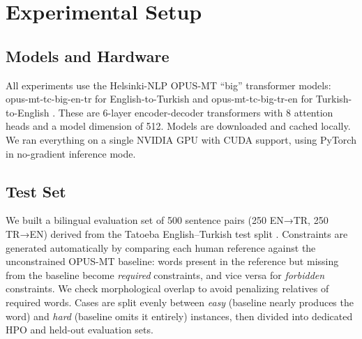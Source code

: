 \documentclass[conference]{IEEEtran}
\begin{document}
\begin{table}[!t]
\end{table}


\section{Experimental Setup}

\subsection{Models and Hardware}

All experiments use the Helsinki-NLP OPUS-MT ``big'' transformer models: opus-mt-tc-big-en-tr for English-to-Turkish and opus-mt-tc-big-tr-en for Turkish-to-English \cite{tiedemann2020opus, tiedemann2023democratizing}. These are 6-layer encoder-decoder transformers with 8 attention heads and a model dimension of 512. Models are downloaded and cached locally. We ran everything on a single NVIDIA GPU with CUDA support, using PyTorch \cite{paszke2019pytorch} in no-gradient inference mode.

\subsection{Test Set}

We built a bilingual evaluation set of 500 sentence pairs (250 EN→TR, 250 TR→EN) derived from the Tatoeba English--Turkish test split \cite{tiedemann2020tatoeba}. Constraints are generated automatically by comparing each human reference against the unconstrained OPUS-MT baseline: words present in the reference but missing from the baseline become \emph{required} constraints, and vice versa for \emph{forbidden} constraints. We check morphological overlap to avoid penalizing relatives of required words. Cases are split evenly between \emph{easy} (baseline nearly produces the word) and \emph{hard} (baseline omits it entirely) instances, then divided into dedicated HPO and held-out evaluation sets.
\end{document}
